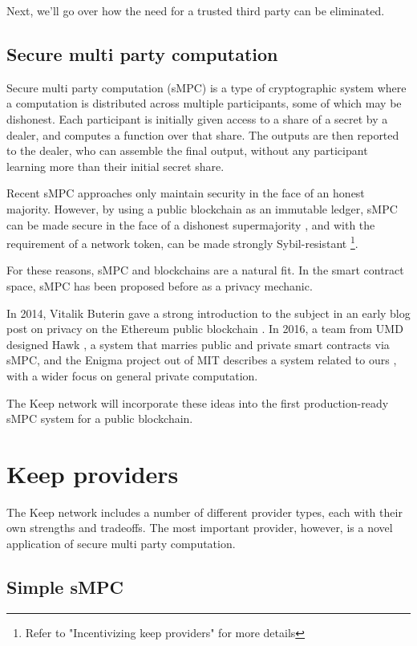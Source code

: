 \documentclass[11pt]{article}
\begin{document}
Next, we’ll go over how the need for a trusted third party can be
eliminated.

\subsection{Secure multi party computation}

Secure multi party computation (sMPC) is a type of cryptographic
system where a computation is distributed across multiple
participants, some of which may be dishonest. Each participant is
initially given access to a share of a secret by a dealer, and
computes a function over that share. The outputs are then reported to
the dealer, who can assemble the final output, without any participant
learning more than their initial secret share.

Recent sMPC approaches only maintain security in the face of an honest
majority. However, by using a public blockchain as an immutable
ledger, sMPC can be made secure in the face of a dishonest
supermajority \cite{spdz}, and with the requirement of a network
token, can be made strongly Sybil-resistant \footnote{Refer to
"Incentivizing keep providers" for more details}.

For these reasons, sMPC and blockchains are a natural fit. In the
smart contract space, sMPC has been proposed before as a privacy
mechanic.

In 2014, Vitalik Buterin gave a strong introduction to the subject in
an early blog post on privacy on the Ethereum public blockchain
\cite{secretSharingDaos}. In 2016, a team from UMD designed Hawk
\cite{hawk}, a system that marries public and private smart contracts
via sMPC, and the Enigma project out of MIT describes a system related
to ours \cite{enigma}, with a wider focus on general private
computation.

The Keep network will incorporate these ideas into the first
production-ready sMPC system for a public blockchain.

\section{Keep providers}

The Keep network includes a number of different provider types, each
with their own strengths and tradeoffs. The most important provider,
however, is a novel application of secure multi party computation.

\subsection{Simple sMPC}
\end{document}
